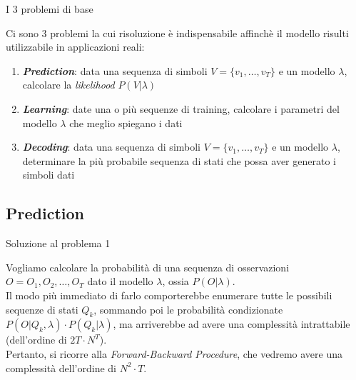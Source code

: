 \documentclass[mathserif]{beamer}
\begin{document}
\begin{frame}{I 3 problemi di base}
 \begin{block}{}
  Ci sono 3 problemi la cui risoluzione \`e indispensabile affinch\`e il modello risulti utilizzabile in applicazioni reali:
	\begin{enumerate}
	 \item \textit{\textbf{Prediction}}: data una sequenza di simboli $V = \{v_{1}, \ldots, v_{T}\}$ e un modello $\lambda$, calcolare la \textit{likelihood} $P(V|\lambda)$
	 \item \textbf{\textit{Learning}}: date una o pi\`u sequenze di training, calcolare i parametri del modello $\lambda$ che meglio spiegano i dati
	 \item \textit{\textbf{Decoding}}: data una sequenza di simboli $V = \{v_{1}, \ldots, v_{T}\}$ e un modello $\lambda$, determinare la pi\`u probabile sequenza di stati che possa aver generato i simboli dati
	\end{enumerate}
 \end{block}
\end{frame}

\subsection{Prediction}

\begin{frame}{Soluzione al problema 1}
 \begin{block}{}
  Vogliamo calcolare la probabilit\`a di una sequenza di osservazioni $O = O_{1}, O_{2}, \ldots, O_{T}$ dato il modello $\lambda$, ossia $P(O|\lambda)$. \\
Il modo pi\`u immediato di farlo comporterebbe enumerare tutte le possibili sequenze di stati $Q_{k}$, sommando poi le probabilit\`a condizionate $P(O|Q_{k},\lambda) \cdot P(Q_{k}|\lambda)$, ma arriverebbe ad avere una complessit\`a intrattabile (dell'ordine di $2T \cdot N^{T}$).\\
Pertanto, si ricorre alla \textit{Forward-Backward Procedure}, che vedremo avere una complessit\`a dell'ordine di $N^2 \cdot T$.
 \end{block}

\end{frame}
\end{document}

